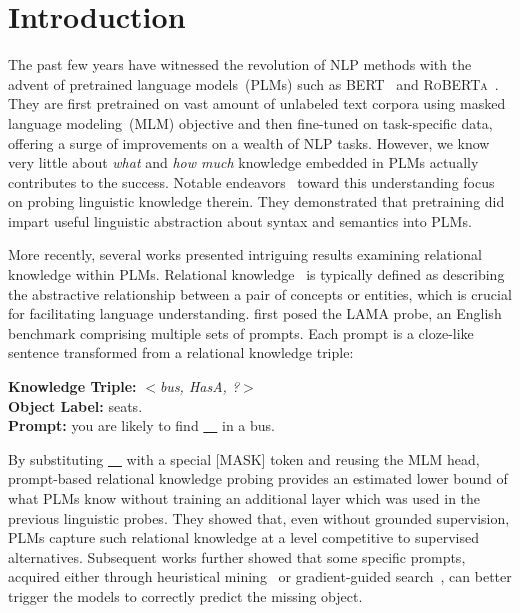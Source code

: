 \section{Introduction}
The past few years have witnessed the revolution of NLP methods with 
the advent of pretrained language models~(PLMs) such as 
\textsc{BERT}~\citep{DBLP:journals/corr/abs-1810-04805} and 
\textsc{RoBERTa}~\citep{DBLP:journals/corr/abs-1907-11692}. They are first pretrained on vast amount of unlabeled text corpora using masked language modeling~(MLM) objective and 
then fine-tuned on task-specific data, offering a surge of 
improvements on a wealth of NLP tasks. However, we know very little about
\textit{what} and \textit{how much} 
knowledge embedded in PLMs actually contributes to the success. 
Notable endeavors~\citep{peters-etal-2018-dissecting,DBLP:journals/corr/abs-1901-05287,DBLP:journals/corr/abs-1905-06316} toward this understanding focus on probing linguistic knowledge therein. They demonstrated that 
pretraining did impart useful linguistic abstraction about syntax and semantics into PLMs.


More recently, several works presented intriguing results examining 
 relational knowledge within PLMs. Relational knowledge~\citep{speer-havasi-2012-representing,wikidata} is typically defined as describing the abstractive relationship between a pair of concepts or entities, which is crucial for facilitating language understanding.
 \citet{Petroni2020} first posed the LAMA probe, 
 an English benchmark comprising multiple sets of prompts. Each prompt is a cloze-like sentence transformed from a relational knowledge triple:
 
 \noindent
 \textbf{Knowledge Triple: }\textit{$<$bus, HasA, ?$>$} \\
 \textbf{Object Label: }seats. \\
 \textbf{Prompt: }you are likely to find \underline{~~} in a bus.

 

By substituting  \underline{~~}  with a special [MASK] token and reusing the MLM head, prompt-based relational knowledge probing provides an estimated lower bound of what PLMs know without training an additional layer which was used
in the previous linguistic probes. They showed that, even without grounded supervision, 
PLMs capture such relational knowledge at a level competitive to supervised alternatives. Subsequent works further showed that some specific prompts, acquired either through heuristical mining~\citep{DBLP:journals/corr/abs-1911-12543} or gradient-guided search~\citep{Shin2020}, can better trigger the models to correctly predict the missing object. 


